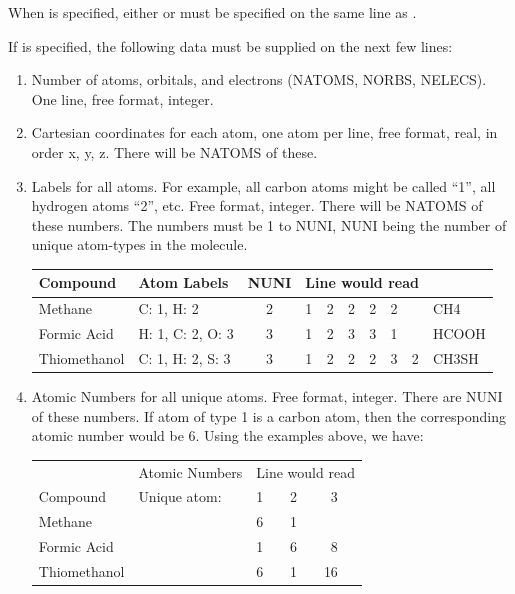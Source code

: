 When  is specified, either  or  must be
specified on the same line as .

If  is specified, the following data must be supplied on the next
few lines:
\begin{enumerate}
\item Number of atoms, orbitals, and electrons (NATOMS, NORBS, NELECS).
One line, free format, integer.
\item Cartesian coordinates for each atom, one atom per line, free format,
real, in order x, y, z. There will be NATOMS of these.
\item Labels for all atoms. For example, all carbon atoms might be called
``1'', all hydrogen atoms ``2'', etc. Free format, integer. There will be NATOMS
of these numbers. The numbers must be 1 to NUNI, NUNI being the number
of unique atom-types in the molecule.

\begin{tabular}{llc|llllll|l} \hline
   Compound   &   Atom Labels       &NUNI &  \multicolumn{6}{c}{Line would read} & \\ \hline
  Methane     & C: 1,   H: 2        & 2 & 1 & 2 & 2 & 2 & 2 &       &   CH4  \\
  Formic Acid & H: 1,   C: 2,  O: 3 & 3 & 1 & 2 & 3 & 3 & 1 &        &  HCOOH  \\
  Thiomethanol& C: 1,   H: 2,  S: 3 & 3 & 1 & 2 & 2 & 2 & 3 & 2     &   CH3SH  \\ \hline
\end{tabular}

\item Atomic Numbers for all unique atoms. Free format, integer. There are
NUNI of these numbers. If atom of type 1 is a carbon atom, then the
corresponding atomic number would be 6. Using the examples above, we have:

\begin{tabular}{ll|lll} \hline
&                 Atomic Numbers & \multicolumn{3}{c}{Line would read}  \\
     Compound     &  Unique atom: &  1 &  2 &  \ 3 \\\hline
     Methane      &          &       6  & 1 & \\
     Formic Acid  &           &      1  & 6 & \  8 \\
     Thiomethanol &           &      6  & 1 & 16 \\ \hline
\end{tabular}


\end{enumerate}
